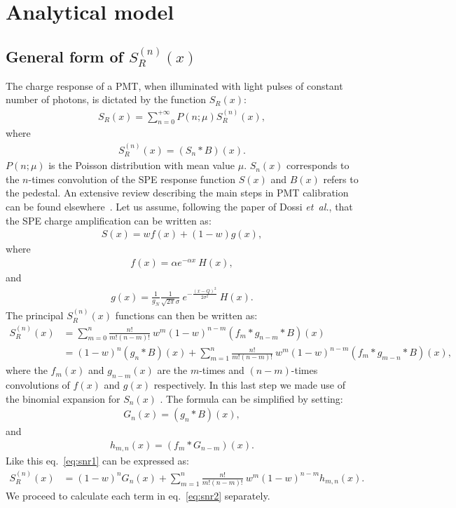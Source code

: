 \documentclass[a4paper,11pt]{article}
\begin{document}
\section{Analytical model}
\label{sec:mod}
%

\subsection{General form of $S^{(n)}_R(x)$ }
%

The charge response of a PMT, when illuminated with light pulses of constant number of photons, is dictated by the function $S_R(x)$:
\begin{align}
S_R(x) = \sum_{n=0}^{+\infty} P(n;\mu) S^{(n)}_R(x),
\end{align}
where 
\begin{align}
S^{(n)}_R(x) = (S_n*B)(x). 
\end{align}
$ P(n;\mu)$ is the Poisson distribution with mean value $\mu$. 
$S_n(x)$ corresponds to the $n$-times convolution of the SPE response function $S(x)$ and $B(x)$ refers to the pedestal. 
An extensive review describing the main steps in PMT calibration can be found elsewhere~\cite{me2}. 
Let us assume, following the paper of Dossi \emph{et~al.}, that the SPE charge amplification can be written as:
\begin{align}
S(x) = w f(x) + (1-w)g(x),
\end{align}
where 
\begin{align}
f(x) = \alpha e^{-\alpha x } \ H(x),
\end{align}
and
\begin{align}
g(x) = \frac{1}{g_N} \frac{1}{\sqrt{2\pi}\sigma} \ e^{ - \frac{( x - Q )^2}{2\sigma^2}} \ H(x). 
\end{align}
The principal $S^{(n)}_R(x)$ functions can then be written as:
\begin{align}
S^{(n)}_R(x) & = \sum_{m=0}^{n}  \frac{n!}{m!(n-m)!} \ w^m (1-w)^{n-m} (f_m*g_{n-m} *B )(x)\nonumber \\
                     & = (1-w)^n (g_{n} *B )(x) + \sum_{m=1}^{n}  \frac{n!}{m!(n-m)!} \ w^m (1-w)^{n-m} (f_m*g_{m-n} *B )(x), \label{eq:snr1}
\end{align}
where the $f_m(x)$ and $g_{n-m}(x)$ are the $m$-times and $(n-m)$-times convolutions of $f(x)$ and $g(x)$ respectively. 
In this last step we made use of the binomial expansion for $S_n(x)$ \cite{error}. 
The formula can be simplified by setting:
\begin{align}
G_n(x) = (g_{n} *B )(x), 
\end{align}
and 
\begin{align}
h_{m,n}(x) = (f_{m} * G_{n-m} )(x).  
\end{align}
Like this eq.~\eqref{eq:snr1} can be expressed as:
\begin{align}
S^{(n)}_R(x) & = (1-w)^n G_n(x) + \sum_{m=1}^{n}  \frac{n!}{m!(n-m)!} \ w^m (1-w)^{n-m} h_{m,n}(x). \label{eq:snr2}
\end{align}
We proceed to calculate each term in eq.~\eqref{eq:snr2} separately.  
\end{document}
